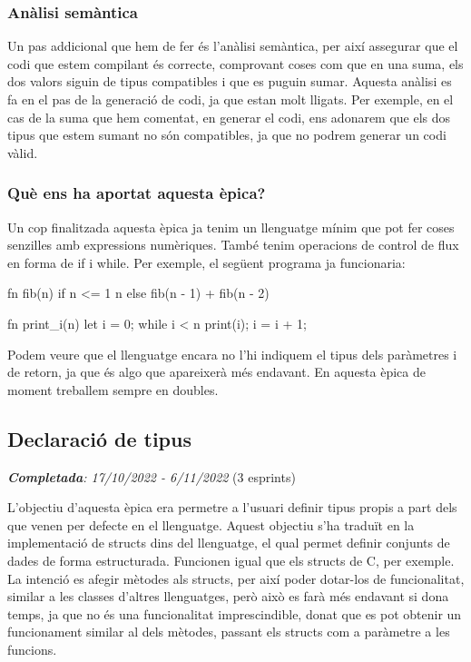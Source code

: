 ﻿\documentclass{article}
\begin{document}
\subsubsection{Anàlisi semàntica}
Un pas addicional que hem de fer és l'anàlisi semàntica, per així assegurar que
el codi que estem compilant és correcte, comprovant coses com que en una suma,
els dos valors siguin de tipus compatibles i que es puguin sumar. Aquesta
anàlisi es fa en el pas de la generació de codi, ja que estan molt lligats. Per
exemple, en el cas de la suma que hem comentat, en generar el codi, ens adonarem
que els dos tipus que estem sumant no són compatibles, ja que no podrem generar
un codi vàlid.

\subsubsection{Què ens ha aportat aquesta èpica?}
Un cop finalitzada aquesta èpica ja tenim un llenguatge mínim que pot fer coses
senzilles amb expressions numèriques. També tenim operacions de control de flux
en forma de if i while. Per exemple, el següent programa ja funcionaria:

\begin{code}
fn fib(n) {
    if n <= 1 {
        n
    } else {
        fib(n - 1) + fib(n - 2)
    }
}

fn print_i(n) {
    let i = 0;
    while i < n {
        print(i);
        i = i + 1;
    }
}
\end{code}

Podem veure que el llenguatge encara no l'hi indiquem el tipus dels paràmetres
i de retorn, ja que és algo que apareixerà més endavant. En aquesta èpica de 
moment treballem sempre en doubles.

\subsection{Declaració de tipus}
\textit{\textbf{Completada}: 17/10/2022 - 6/11/2022} (3 esprints)

L'objectiu d'aquesta èpica era permetre a l'usuari definir tipus propis a part
dels que venen per defecte en el llenguatge. Aquest objectiu s'ha traduït en la
implementació de structs dins del llenguatge, el qual permet definir conjunts de
dades de forma estructurada. Funcionen igual que els structs de C, per exemple.
La intenció es afegir mètodes als structs, per així poder dotar-los de
funcionalitat, similar a les classes d'altres llenguatges, però això es farà més
endavant si dona temps, ja que no és una funcionalitat imprescindible, donat que
es pot obtenir un funcionament similar al dels mètodes, passant els structs com
a paràmetre a les funcions.
\end{document}
